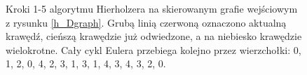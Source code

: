 \documentclass[a4paper, 12pt, twoside, openright]{article}
\begin{document}
\begin{figure}[!p]
   	\caption[]{Kroki 1-5 algorytmu Hierholzera na skierowanym grafie wejściowym z rysunku \ref{h_Dgraph}. Grubą linią czerwoną oznaczono aktualną krawędź, cieńszą krawędzie już odwiedzone, a na niebiesko krawędzie wielokrotne. Cały cykl Eulera przebiega kolejno przez wierzchołki: 0, 1, 2, 0, 4, 2, 3, 1, 3, 1, 4, 3, 4, 3, 2, 0.}
   	\label{imgHierAlgoEgz3}
   \end{figure}	

   \captionsetup{justification=centering}
   \begin{figure}[p]
   	\centering
   	\quad
   	\quad
   	\quad

\end{figure}
\end{document}
